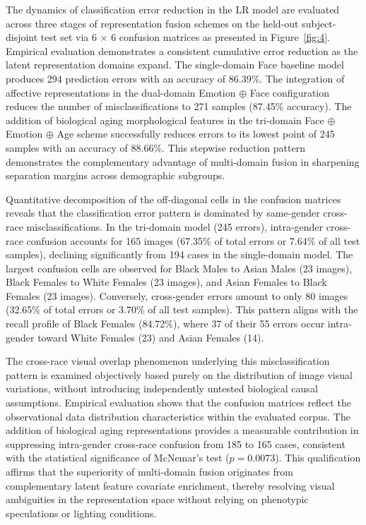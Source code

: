 The dynamics of classification error reduction in the LR model are evaluated across three stages of representation fusion schemes on the held-out subject-disjoint test set via 6 $\times$ 6 confusion matrices as presented in Figure~\ref{fig:4}. Empirical evaluation demonstrates a consistent cumulative error reduction as the latent representation domains expand. The single-domain Face baseline model produces 294 prediction errors with an accuracy of 86.39\%. The integration of affective representations in the dual-domain Emotion $\oplus$ Face configuration reduces the number of misclassifications to 271 samples (87.45\% accuracy). The addition of biological aging morphological features in the tri-domain Face $\oplus$ Emotion $\oplus$ Age scheme successfully reduces errors to its lowest point of 245 samples with an accuracy of 88.66\%. This stepwise reduction pattern demonstrates the complementary advantage of multi-domain fusion in sharpening separation margins across demographic subgroups.

Quantitative decomposition of the off-diagonal cells in the confusion matrices reveals that the classification error pattern is dominated by same-gender cross-race misclassifications. In the tri-domain model (245 errors), intra-gender cross-race confusion accounts for 165 images (67.35\% of total errors or 7.64\% of all test samples), declining significantly from 194 cases in the single-domain model. The largest confusion cells are observed for Black Males to Asian Males (23 images), Black Females to White Females (23 images), and Asian Females to Black Females (23 images). Conversely, cross-gender errors amount to only 80 images (32.65\% of total errors or 3.70\% of all test samples). This pattern aligns with the recall profile of Black Females (84.72\%), where 37 of their 55 errors occur intra-gender toward White Females (23) and Asian Females (14).

The cross-race visual overlap phenomenon underlying this misclassification pattern is examined objectively based purely on the distribution of image visual variations, without introducing independently untested biological causal assumptions. Empirical evaluation shows that the confusion matrices reflect the observational data distribution characteristics within the evaluated corpus. The addition of biological aging representations provides a measurable contribution in suppressing intra-gender cross-race confusion from 185 to 165 cases, consistent with the statistical significance of McNemar's test ($p = 0.0073$). This qualification affirms that the superiority of multi-domain fusion originates from complementary latent feature covariate enrichment, thereby resolving visual ambiguities in the representation space without relying on phenotypic speculations or lighting conditions.
